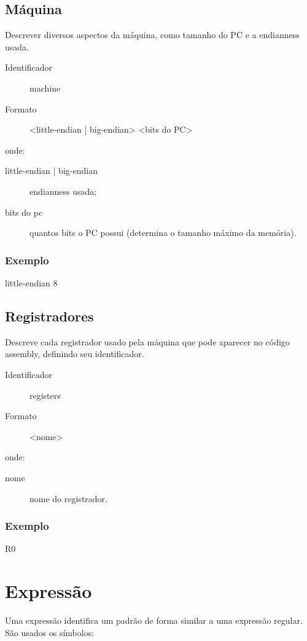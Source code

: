 \documentclass[a4paper,10pt]{article}
\begin{document}
	\subsection{Máquina}
		\label{máquina}
		Descrever diversos aspectos da máquina, como tamanho do PC e a endianness usada.
		\begin{description}
		 \item [Identificador] machine
		 \item [Formato] <little-endian | big-endian> <bits do PC>
		\end{description}
		onde:
		\begin{description}
		 \item [little-endian | big-endian] endianness usada;
		 \item [bits do pc] quantos bits o PC possui (determina o tamanho máximo da memória).
		\end{description}

		\subsubsection{Exemplo}
			little-endian 8
			
	\subsection{Registradores}
		\label{registradores}
		
		Descreve cada registrador usado pela máquina que pode aparecer no código assembly, definindo seu identificador.
		\begin{description}
		 \item [Identificador] registers
		 \item [Formato] <nome>
		\end{description}
		onde:
		\begin{description}
		 \item [nome] nome do registrador.
		\end{description}

		\subsubsection{Exemplo}
			R0
			
\section{Expressão}
\label{expressão}
Uma expressão identifica um padrão de forma similar a uma expressão regular. São usados os símbolos: 
\end{document}
